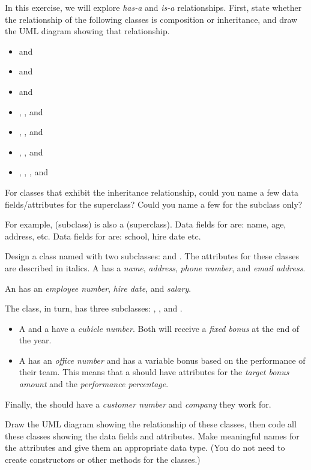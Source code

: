 \begin{exercise}
In this exercise, we will explore {\em has-a} and {\em is-a} relationships. First, state whether the relationship of the following classes is composition or inheritance, and draw the UML diagram showing that relationship.

\begin{itemize}
    \item {} and 
    \item {} and 
    \item {} and 
    \item {}, , and 
    \item {}, , and 
    \item {}, , and 
    \item {}, , , and 
\end{itemize}


For classes that exhibit the inheritance relationship, could you name a few data fields/attributes for the superclass? Could you name a few for the subclass only?

For example,  (subclass) is also a  (superclass). 
Data fields for  are: name, age, address, etc.
Data fields for  are: school, hire date etc.

\end{exercise}

\begin{exercise}
Design a class named  with two subclasses:  and . The attributes for these classes are described in italics. A  has a {\em name}, {\em address}, {\em phone number}, and  {\em email address}.

An  has an {\em employee number}, {\em hire date}, and {\em salary}.

The  class, in turn, has three subclasses: , , and . 
\begin{itemize}
\item A  and a  have a {\em cubicle number}. Both will receive a {\em fixed bonus} at the end of the year.
\item A  has an {\em office number} and has a variable bonus based on the performance of their team. This means that a  should have attributes for the {\em target bonus amount} and the {\em performance percentage}.
\end{itemize}

Finally, the  should have a {\em customer number} and {\em company} they work for.

Draw the UML diagram showing the relationship of these classes, then code all these classes showing the data fields and attributes. Make meaningful names for the attributes and give them an appropriate data type. (You do not need to create constructors or other methods for the classes.)
\end{exercise}

